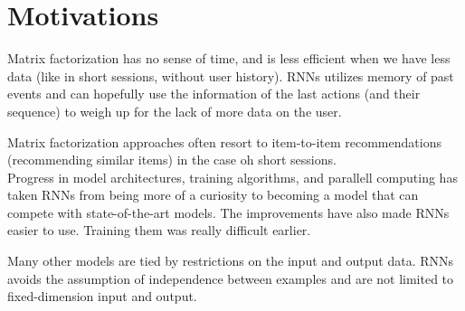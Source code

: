 \chapter{Motivations}
Matrix factorization has no sense of time, and is less efficient when we have less data (like in short sessions, without user history). RNNs utilizes memory of past events and can hopefully use the information of the last actions (and their sequence) to weigh up for the lack of more data on the user.

Matrix factorization approaches often resort to item-to-item recommendations (recommending similar items) in the case oh short sessions.\\

Progress in model architectures, training algorithms, and parallell computing has taken RNNs from being more of a curiosity to becoming a model that can compete with state-of-the-art models. The improvements have also made RNNs easier to use. Training them was really difficult earlier.

Many other models are tied by restrictions on the input and output data. RNNs avoids the assumption of independence between examples and are not limited to fixed-dimension input and output.